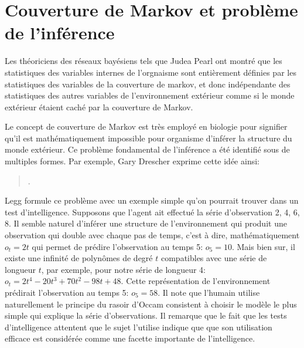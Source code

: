 


\section{Couverture de Markov et problème de l'inférence}

\noindent
Les théoriciens des réseaux bayésiens tels que Judea Pearl \cite{pearl_probabilistic_1988} ont montré que les statistiques des variables internes de l'orgnaisme sont entièrement définies par les statistiques des variables de la couverture de markov, et donc indépendante des statistiques des autres variables de l'environnement extérieur comme si le monde extérieur étaient caché par la couverture de Markov.


Le concept de couverture de Markov est très employé en biologie pour signifier qu'il est mathématiquement impossible pour organisme d'inférer la structure du monde extérieur.
Ce problème fondamental de l'inférence a été identifié sous de multiples formes. 
Par exemple, Gary Drescher exprime cette idée ainsi: 
\begin{quote}
	\cite[p.~174]{drescher_made-up_1991}. 
\end{quote}

Legg \cite{legg_universal_2007} formule ce problème avec un exemple simple qu'on pourrait trouver dans un test d'intelligence. 
Supposons que l'agent ait effectué la série d'observation 2, 4, 6, 8. 
Il semble naturel d'inférer une structure de l'environnement qui produit une observation qui double avec chaque pas de temps, c'est à dire, mathématiquement $o_t = 2t$ qui permet de prédire l'observation au temps 5: $o_5 = 10$. 
Mais bien sur, il existe une infinité de polynômes de degré $t$ compatibles avec une série de longueur $t$, par exemple, pour notre série de longueur 4:  $o_t = 2t^4 - 20 t^3 + 70t^2 - 98t + 48$. 
Cette représentation de l'environnement prédirait l'observation au temps 5: $o_5 = 58$.
Il note que l'humain utilise naturellement le principe du rasoir d'Occam consistent à choisir le modèle le plus simple qui \og explique \fg la série d'observations. 
Il remarque que le fait que les tests d'intelligence attentent que le sujet l'utilise indique que que son utilisation efficace est considérée comme une facette importante de l'intelligence.   



